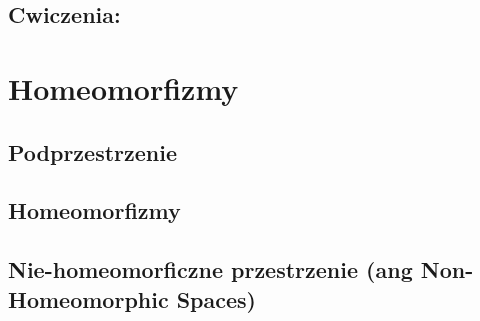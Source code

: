 \documentclass{article}
\begin{document}
\subsection{Cwiczenia:}

\section{Homeomorfizmy}

\subsection{Podprzestrzenie}
\subsection{Homeomorfizmy}
\subsection{Nie-homeomorficzne przestrzenie (ang Non-Homeomorphic Spaces)}
\end{document}
